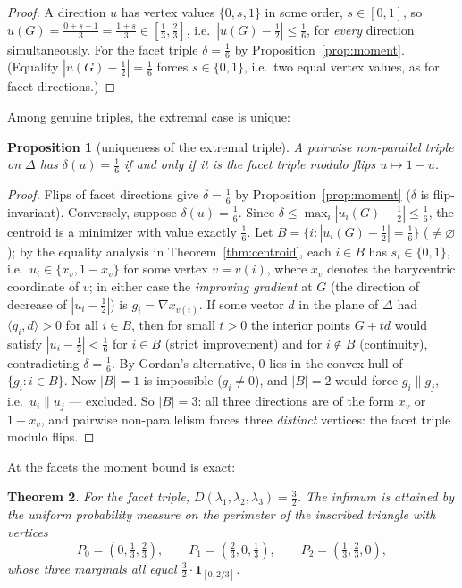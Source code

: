 \documentclass{aims}
\numberwithin{equation}{section}
\theoremstyle{plain}
\newtheorem{theorem}{Theorem}[section]
\newtheorem{proposition}[theorem]{Proposition}
\theoremstyle{definition}
\theoremstyle{remark}
\begin{document}
\begin{proof}
A direction $u$ has vertex values $\{0,s,1\}$ in some order, $s\in[0,1]$, so
$u(G)=\tfrac{0+s+1}3=\tfrac{1+s}3\in[\tfrac13,\tfrac23]$, i.e.\
$|u(G)-\tfrac12|\le\tfrac16$, for \emph{every} direction simultaneously. For
the facet triple $\delta=\tfrac16$ by Proposition~\ref{prop:moment}. (Equality
$|u(G)-\tfrac12|=\tfrac16$ forces $s\in\{0,1\}$, i.e.\ two equal vertex
values, as for facet directions.)
\end{proof}

Among genuine triples, the extremal case is unique:

\begin{proposition}[uniqueness of the extremal triple]\label{prop:deltamax}
A pairwise non-parallel triple on $\Delta$ has $\delta(u)=\tfrac16$ if and
only if it is the facet triple modulo flips $u\mapsto1-u$.
\end{proposition}

\begin{proof}
Flips of facet directions give $\delta=\tfrac16$ by
Proposition~\ref{prop:moment} ($\delta$ is flip-invariant). Conversely,
suppose $\delta(u)=\tfrac16$. Since
$\delta\le\max_i|u_i(G)-\tfrac12|\le\tfrac16$, the centroid is a minimizer
with value exactly $\tfrac16$. Let $B=\{i:|u_i(G)-\tfrac12|=\tfrac16\}$
($\ne\varnothing$); by the equality analysis in
Theorem~\ref{thm:centroid}, each $i\in B$ has $s_i\in\{0,1\}$, i.e.\
$u_i\in\{x_{v},1-x_{v}\}$ for some vertex $v=v(i)$, where $x_v$ denotes the
barycentric coordinate of $v$; in either case the \emph{improving gradient}
at $G$ (the direction of decrease of $|u_i-\tfrac12|$) is
$g_i=\nabla x_{v(i)}$. If some vector $d$ in the plane of $\Delta$ had
$\langle g_i,d\rangle>0$ for all $i\in B$, then for small $t>0$ the interior
points $G+td$ would satisfy $|u_i-\tfrac12|<\tfrac16$ for $i\in B$ (strict
improvement) and for $i\notin B$ (continuity), contradicting
$\delta=\tfrac16$. By Gordan's alternative, $0$ lies in the convex hull of
$\{g_i:i\in B\}$. Now $|B|=1$ is impossible ($g_i\ne0$), and $|B|=2$ would
force $g_i\parallel g_j$, i.e.\ $u_i\parallel u_j$ --- excluded. So $|B|=3$:
all three directions are of the form $x_v$ or $1-x_v$, and pairwise
non-parallelism forces three \emph{distinct} vertices: the facet triple
modulo flips.
\end{proof}

At the facets the moment bound is exact:

\begin{theorem}\label{thm:facetdefect}
For the facet triple, $D(\lambda_1,\lambda_2,\lambda_3)=\tfrac32$. The infimum
is attained by the uniform probability measure on the perimeter of the inscribed
triangle with vertices
\[
P_0=(0,\tfrac13,\tfrac23),\qquad P_1=(\tfrac23,0,\tfrac13),\qquad
P_2=(\tfrac13,\tfrac23,0),
\]
whose three marginals all equal $\tfrac32\cdot\mathbf 1_{[0,2/3]}$.
\end{theorem}
\end{document}
